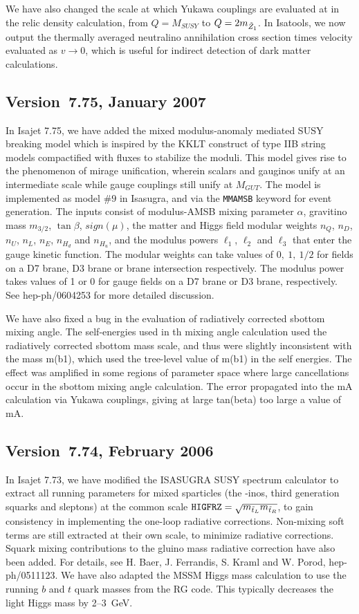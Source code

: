We have also changed the scale at which Yukawa couplings are evaluated at in the relic 
density calculation, from $Q=M_{SUSY}$ to $Q=2m_{\tilde Z_1}$. In Isatools, we now output
the thermally averaged neutralino annihilation cross section times velocity evaluated 
as $v\rightarrow 0$, which is useful for indirect detection of dark matter calculations.

\subsection{Version~7.75, January 2007}

In Isajet 7.75, we have added the mixed modulus-anomaly mediated
SUSY breaking model which is inspired by the KKLT construct of
type IIB string models compactified with fluxes to stabilize the moduli.
This model gives rise to the phenomenon of mirage unification, wherein
scalars and gauginos unify at an intermediate scale while gauge couplings still
unify at $M_{GUT}$. The model is implemented as model $\#9$ in Isasugra,
and via the \verb|MMAMSB| keyword for event generation. The inputs consist
of modulus-AMSB mixing parameter $\alpha$, gravitino mass $m_{3/2}$,
$\tan\beta$, $sign(\mu )$, the matter and Higgs field modular weights
$n_Q$, $n_D$, $n_U$, $n_L$, $n_E$, $n_{H_d}$ and $n_{H_u}$, and the
modulus powers $\ell_1$, $\ell_2$ and $\ell_3$ that enter the 
gauge kinetic function. The modular weights can take values of
$0,\ 1,\ {1/2}$ for fields on a D7 brane, D3 brane or brane intersection
respectively. The modulus power takes values of 1 or 0 for gauge fields
on a D7 brane or D3 brane, respectively. See hep-ph/0604253 for more
detailed discussion.

We have also fixed a bug in the evaluation of radiatively corrected 
sbottom mixing angle. The self-energies used in th mixing angle calculation
used the radiatively corrected sbottom mass scale, and thus were slightly
inconsistent with the mass m(b1), which used the tree-level value of
m(b1) in the self energies. The effect was amplified in some 
regions of parameter space where large cancellations occur in the 
sbottom mixing angle calculation. The error propagated into the mA calculation 
via Yukawa couplings, giving at large tan(beta) too large a value of mA.

\subsection{Version~7.74, February 2006}

In Isajet 7.73, we have modified the ISASUGRA SUSY spectrum calculator
to extract all running parameters for mixed sparticles (the -inos, third
generation squarks and sleptons) at the common scale ${\tt
HIGFRZ}=\sqrt{m_{\tilde t_L} m_{\tilde t_R}}$, to gain consistency in
implementing the one-loop radiative corrections. Non-mixing soft terms
are still extracted at their own scale, to minimize radiative
corrections.  Squark mixing contributions to the gluino mass radiative
correction have also been added. For details, see H. Baer, J. Ferrandis,
S. Kraml and W. Porod, hep-ph/0511123.
We have also adapted the MSSM Higgs mass calculation to use the
running $b$ and $t$ quark masses from the RG code. This typically
decreases the light Higgs mass by 2--3~GeV.

